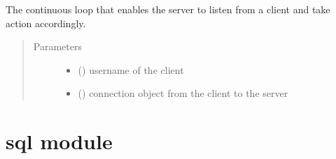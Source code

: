 \documentclass[letterpaper,10pt,english]{sphinxmanual}
\begin{document}
\begin{fulllineitems}
\label{\detokenize{server:server.talk}}
The continuous loop that enables the server to listen from a client and take action accordingly.
\begin{quote}\begin{description}
\item[{Parameters}] \leavevmode\begin{itemize}
\item {} 
 () \textendash{} username of the client

\item {} 
 () \textendash{} connection object from the client to the server

\end{itemize}

\end{description}\end{quote}

\end{fulllineitems}



\section{sql module}
\label{\detokenize{sql:module-sql}}\label{\detokenize{sql:sql-module}}\label{\detokenize{sql::doc}}
\end{document}
